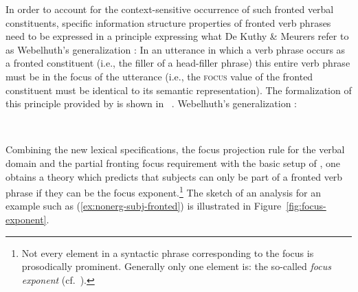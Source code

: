\documentclass[output=paper
 	        ,biblatex
                ,babelshorthands
                ,newtxmath
                ,draftmode
                ,colorlinks, citecolor=brown
]{langscibook}
\begin{document}
In order to account for the context-sensitive occurrence of such
fronted verbal constituents, specific information structure properties
of fronted verb phrases need to be expressed in a principle expressing
what De Kuthy \& Meurers refer to as Webelhuth's generalization \citep[53]{Webelhuth90-ohne-crossref}: In
an utterance in which a verb phrase occurs as a fronted constituent
(i.e., the filler of a head-filler phrase) this entire verb phrase
must be in the focus of the utterance (i.e., the \textsc{focus} value
of the fronted constituent must be identical to its semantic
representation).  The formalization of this principle provided by \citep{dKM2003a} is shown in~ .
\ea
\bigskip
Webelhuth's generalization \citep{dKM2003a}:\\
\begin{flushleft}
\impl\ 
\end{flushleft}
\begin{flushright}
\medskip
\label{fig:webelhuths-generalization}
\end{flushright}\unskip
\z
Combining the new lexical specifications, the focus projection rule
for the verbal domain and the partial fronting focus requirement with
the basic setup of \cite{deKuthy2002a}, one obtains a theory which
predicts that subjects can only be part of a fronted verb phrase
if they can be the focus exponent.\footnote{Not every element in a syntactic phrase corresponding to the focus is prosodically prominent. Generally only one element is: the so-called \textit{focus exponent} (cf.\ \citealt{Selkirk95a-u}).} The sketch of an analysis for an
example such as (\ref{ex:nonerg-subj-fronted}) is illustrated in
Figure~\ref{fig:focus-exponent}.
\end{document}
